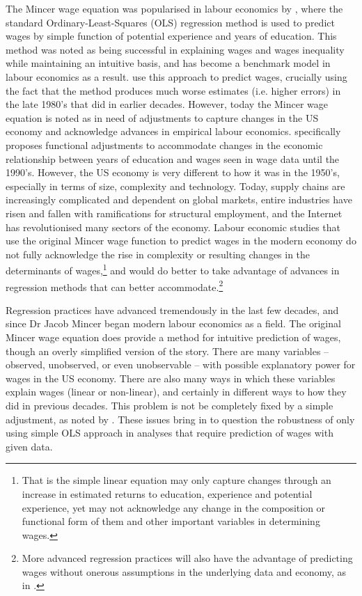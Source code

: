 \documentclass[notitlepage,12pt]{article}
\begin{document}
The Mincer wage equation was popularised in labour economics by \cite{mincer1958investment,mincer1974schooling}, where the standard Ordinary-Least-Squares (OLS) regression method is used to predict wages by simple function of potential experience and years of education.  This method was noted as being successful in explaining wages and wages inequality while maintaining an intuitive basis, and has become a benchmark model in labour economics as a result.  \cite{juhn1993wage} use this approach to predict wages, crucially using the fact that the method produces much worse estimates (i.e. higher errors) in the late 1980's that did in earlier decades.  However, today the Mincer wage equation is noted as in need of adjustments to capture changes in the US economy and acknowledge advances in empirical labour economics.  \cite{lemieux2006mincer} specifically proposes functional adjustments to accommodate changes in the economic relationship between years of education and wages seen in wage data until the 1990's.  However, the US economy is very different to how it was in the 1950's, especially in terms of size, complexity and technology.  Today, supply chains are increasingly complicated and dependent on global markets, entire industries have risen and fallen with ramifications for structural employment, and the Internet has revolutionised many sectors of the economy.  Labour economic studies that use the original Mincer wage function to predict wages in the modern economy do not fully acknowledge the rise in complexity or resulting changes in the determinants of wages,\footnote{That is the simple linear equation may only capture changes through an increase in estimated returns to education, experience and potential experience, yet may not acknowledge any change in the composition or functional form of them and other important variables in determining wages.} and would do better to take advantage of advances in regression methods that can better accommodate.\footnote{More advanced regression practices will also have the advantage of predicting wages without onerous assumptions in the underlying data and economy, as in \cite{juhn1993wage}.} 

Regression practices have advanced tremendously in the last few decades, and since Dr Jacob Mincer began modern labour economics as a field.  The original Mincer wage equation does provide a method for intuitive prediction of wages, though an overly simplified version of the story.  There are many variables -- observed, unobserved, or even unobservable -- with possible explanatory power for wages in the US economy.  There are also many ways in which these variables explain wages (linear or non-linear), and certainly in different ways to how they did in previous decades.  This problem is not be completely fixed by a simple adjustment, as noted by \cite{lemieux2006increasing}.  These issues bring in to question the robustness of only using simple OLS approach in analyses that require prediction of wages with given data.
\end{document}
